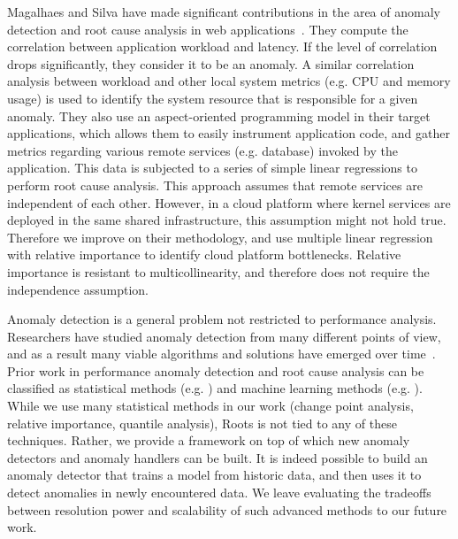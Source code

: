 Magalhaes and Silva have made significant contributions in the area of anomaly detection
and root cause analysis in web applications~\cite{Magalhaes:2010:DPA:1906485.1906774, Magalhaes:2011:RAP:1982185.1982234}. 
They compute the correlation between application
workload and latency. If the level of correlation drops significantly, they consider it to be an
anomaly. A similar correlation analysis between workload and other local system metrics 
(e.g. CPU and memory usage) is used to identify the system resource that is responsible for
a given anomaly.
They also use an aspect-oriented programming model in their target applications, which
allows them to easily instrument application code, and gather metrics regarding various 
remote services (e.g. database) invoked by the application. This data is subjected to a 
series of simple linear regressions to perform root cause analysis. This approach assumes
that remote services are independent of each other. However, in a cloud platform where
kernel services are deployed in the same shared infrastructure, this assumption might not
hold true. Therefore we improve on their methodology, and use multiple linear regression
with relative importance to identify cloud platform bottlenecks. Relative importance
is resistant to multicollinearity, and therefore does not require the independence assumption.

Anomaly detection is a general problem not restricted to performance analysis. Researchers
have studied anomaly detection from many different points of view, and as a result many
viable algorithms and solutions have emerged over time~\cite{Chandola:2009:ADS:1541880.1541882}.
Prior work in performance anomaly detection and root cause analysis can be classified as statistical
methods (e.g. \cite{6311395,Malkowski:2007:BDU:1783374.1783389,Magalhaes:2011:RAP:1982185.1982234,Nguyen:2011:PPR:2038633.2038634}) 
and machine learning methods (e.g. \cite{Cohen:2004:CID:1251254.1251270,Yu:2013:SNA:2494621.2494643,bhaduri2011detecting}).
While we use many statistical methods
in our work (change point analysis, relative importance, quantile analysis), Roots is not tied to any of these
techniques. Rather, we provide a framework on top of which new anomaly detectors and anomaly
handlers can be built. It is indeed possible to build an anomaly detector that trains a model
from historic data, and then uses it to detect anomalies in newly encountered data. We
leave evaluating the tradeoffs between resolution power and scalability of such advanced
methods to our future work.